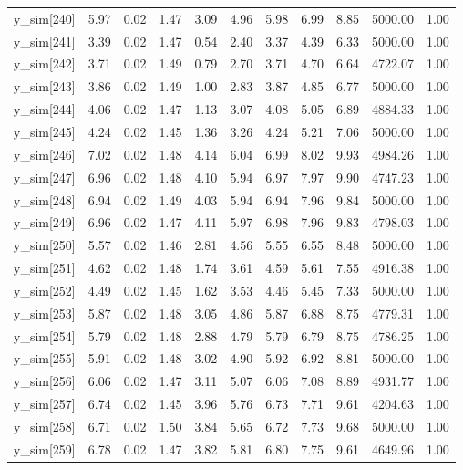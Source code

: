 \begin{table}[ht]
\begin{tabular}{rrrrrrrrrrr}
  y\_sim[240] & 5.97 & 0.02 & 1.47 & 3.09 & 4.96 & 5.98 & 6.99 & 8.85 & 5000.00 & 1.00 \\ 
  y\_sim[241] & 3.39 & 0.02 & 1.47 & 0.54 & 2.40 & 3.37 & 4.39 & 6.33 & 5000.00 & 1.00 \\ 
  y\_sim[242] & 3.71 & 0.02 & 1.49 & 0.79 & 2.70 & 3.71 & 4.70 & 6.64 & 4722.07 & 1.00 \\ 
  y\_sim[243] & 3.86 & 0.02 & 1.49 & 1.00 & 2.83 & 3.87 & 4.85 & 6.77 & 5000.00 & 1.00 \\ 
  y\_sim[244] & 4.06 & 0.02 & 1.47 & 1.13 & 3.07 & 4.08 & 5.05 & 6.89 & 4884.33 & 1.00 \\ 
  y\_sim[245] & 4.24 & 0.02 & 1.45 & 1.36 & 3.26 & 4.24 & 5.21 & 7.06 & 5000.00 & 1.00 \\ 
  y\_sim[246] & 7.02 & 0.02 & 1.48 & 4.14 & 6.04 & 6.99 & 8.02 & 9.93 & 4984.26 & 1.00 \\ 
  y\_sim[247] & 6.96 & 0.02 & 1.48 & 4.10 & 5.94 & 6.97 & 7.97 & 9.90 & 4747.23 & 1.00 \\ 
  y\_sim[248] & 6.94 & 0.02 & 1.49 & 4.03 & 5.94 & 6.94 & 7.96 & 9.84 & 5000.00 & 1.00 \\ 
  y\_sim[249] & 6.96 & 0.02 & 1.47 & 4.11 & 5.97 & 6.98 & 7.96 & 9.83 & 4798.03 & 1.00 \\ 
  y\_sim[250] & 5.57 & 0.02 & 1.46 & 2.81 & 4.56 & 5.55 & 6.55 & 8.48 & 5000.00 & 1.00 \\ 
  y\_sim[251] & 4.62 & 0.02 & 1.48 & 1.74 & 3.61 & 4.59 & 5.61 & 7.55 & 4916.38 & 1.00 \\ 
  y\_sim[252] & 4.49 & 0.02 & 1.45 & 1.62 & 3.53 & 4.46 & 5.45 & 7.33 & 5000.00 & 1.00 \\ 
  y\_sim[253] & 5.87 & 0.02 & 1.48 & 3.05 & 4.86 & 5.87 & 6.88 & 8.75 & 4779.31 & 1.00 \\ 
  y\_sim[254] & 5.79 & 0.02 & 1.48 & 2.88 & 4.79 & 5.79 & 6.79 & 8.75 & 4786.25 & 1.00 \\ 
  y\_sim[255] & 5.91 & 0.02 & 1.48 & 3.02 & 4.90 & 5.92 & 6.92 & 8.81 & 5000.00 & 1.00 \\ 
  y\_sim[256] & 6.06 & 0.02 & 1.47 & 3.11 & 5.07 & 6.06 & 7.08 & 8.89 & 4931.77 & 1.00 \\ 
  y\_sim[257] & 6.74 & 0.02 & 1.45 & 3.96 & 5.76 & 6.73 & 7.71 & 9.61 & 4204.63 & 1.00 \\ 
  y\_sim[258] & 6.71 & 0.02 & 1.50 & 3.84 & 5.65 & 6.72 & 7.73 & 9.68 & 5000.00 & 1.00 \\ 
  y\_sim[259] & 6.78 & 0.02 & 1.47 & 3.82 & 5.81 & 6.80 & 7.75 & 9.61 & 4649.96 & 1.00 \\ 

\end{tabular}
\end{table}
